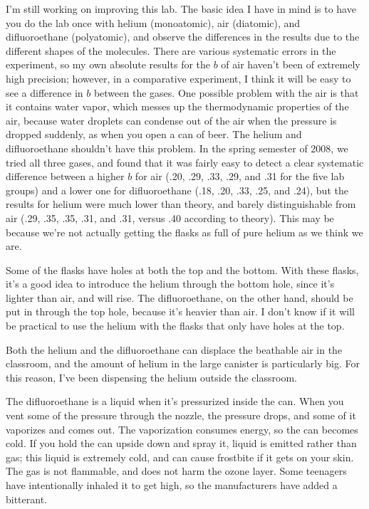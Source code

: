 I'm still working on improving this lab.
The basic idea I have in mind is to have you do the lab once with helium (monoatomic),
air (diatomic), and difluoroethane (polyatomic),
and observe the differences in the results due to the different shapes
of the molecules. There are various systematic errors in the experiment, 
so my own absolute results for the $b$ of air haven't been of extremely high
precision; however, in a comparative experiment, I think it will be easy to see
a difference in $b$ between the gases. One possible problem with the air is that it
contains water vapor, which messes up the thermodynamic properties of
the air, because water droplets can condense out of the air when the pressure
is dropped suddenly, as when you open a can of beer. The helium and difluoroethane
shouldn't have this problem. In the spring semester of 2008, we tried all three gases,
and found that it was fairly easy to detect a clear systematic difference
between a higher $b$ for air (.20, .29, .33, .29, and .31 for the five lab groups) and
a lower one for difluoroethane (.18, .20, .33, .25, and .24), but the results for helium
were much lower than theory, and barely distinguishable from air (.29, .35, .35, .31, and .31,
versus .40 according to theory). This may be because we're not actually getting the flasks
as full of pure helium as we think we are.

Some of the flasks have holes at both the top and the bottom. With these flasks, it's
a good idea to introduce the helium through the bottom hole, since it's lighter than
air, and will rise. The difluoroethane, on the other hand, should be put in through the
top hole, because it's heavier than air. I don't know if it will be practical to use
the helium with the flasks that only have holes at the top.

Both the helium and the difluoroethane can displace the beathable air in the classroom,
and the amount of helium in the large canister is particularly big.
For this reason, I've been dispensing the helium outside the classroom.

The difluoroethane is a liquid when it's pressurized inside the can. When you vent
some of the pressure through the nozzle, the pressure drops, and some of it vaporizes
and comes out. The vaporization consumes energy, so the can becomes cold. If you hold
the can upside down and spray it, liquid is emitted rather than gas; this liquid is
extremely cold, and can cause frostbite if it gets on your skin. The gas is not flammable,
and does not harm the ozone layer. Some teenagers have intentionally inhaled it to get
high, so the manufacturers have added a bitterant.
